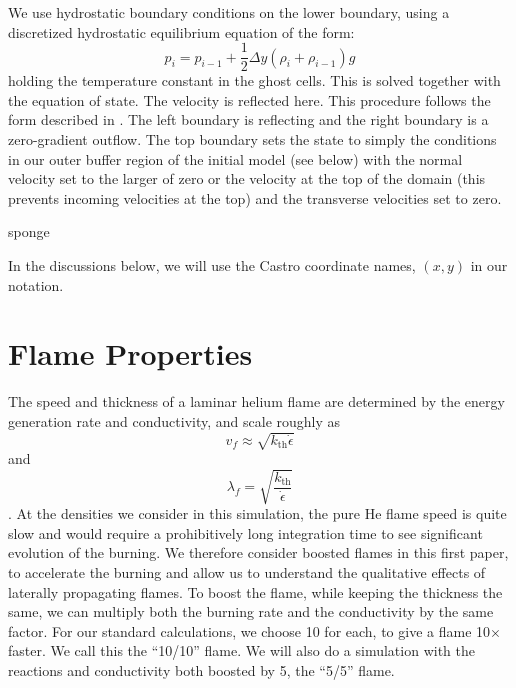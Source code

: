 \documentclass[preprint,times,tighten]{aastex63}
\newcommand{\AssignTo}[1]{
    \marginpar{\vskip-\baselineskip%
               \raggedright%
               \tiny\sffamily%
               {\color{blue}\hrule%
               \smallskip%
               #1\par%
               \smallskip%
               \hrule}}%
}
\begin{document}
We use hydrostatic boundary conditions on the lower boundary, using
a discretized hydrostatic equilibrium equation of the form:
\begin{equation}
\label{eq:hse}
p_i = p_{i-1} + \frac{1}{2} \Delta y (\rho_i + \rho_{i-1}) g
\end{equation}
holding the temperature constant in the ghost cells.  This is solved
together with the equation of state.  The velocity is reflected here.
This procedure follows the form described in \citet{ppm-hse}.  The
left boundary is reflecting and the right boundary is a zero-gradient
outflow.  The top boundary sets the state to simply the conditions
in our outer buffer region of the initial model (see below) with the
normal velocity set to the larger of zero or the velocity at the top
of the domain (this prevents incoming velocities at the top) and the
transverse velocities set to zero.

sponge\AssignTo{Mike will write}

In the discussions below, we will use the Castro coordinate
names, $(x, y)$ in our notation.



\section{Flame Properties}\label{Sec:Flame}

The speed and thickness of a laminar helium flame are determined by the
energy generation rate and conductivity, and scale roughly as 
\begin{equation}
v_f \approx \sqrt{k_\mathrm{th} \dot{\epsilon}}
\end{equation}
and
\begin{equation}
\lambda_f = \sqrt{\frac{k_\mathrm{th}}{\dot{\epsilon}}}
\end{equation}
\citep{orourke:1979}.
At the densities we consider in this simulation, the pure He flame
speed is quite slow and would require a prohibitively long integration
time to see significant evolution of the burning.  We therefore
consider boosted flames in this first paper, to accelerate the burning
and allow us to understand the qualitative effects of laterally
propagating flames.  To boost the flame, while keeping the thickness
the same, we can multiply both the burning rate and the conductivity
by the same factor.  For our standard calculations, we choose 10 for
each, to give a flame 10$\times$ faster.  We call this the ``10/10''
flame.  We will also do a simulation with the reactions and
conductivity both boosted by 5, the ``5/5'' flame.
\end{document}
